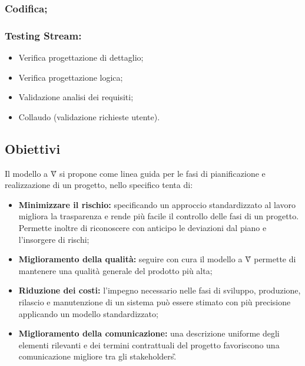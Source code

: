 \subsubsection*{Codifica;}

\subsubsection*{Testing Stream:}
\begin{itemize}
    \item Verifica progettazione di dettaglio;
    \item Verifica progettazione logica;
    \item Validazione analisi dei requisiti;
    \item Collaudo (validazione richieste utente).
\end{itemize}

\subsection{Obiettivi}
Il modello a V\G{} si propone come linea guida per le fasi di pianificazione e realizzazione di un progetto,
nello specifico tenta di:
\begin{itemize}
    \item \textbf{Minimizzare il rischio:} specificando un approccio standardizzato al lavoro migliora 
    la trasparenza e rende più facile il controllo delle fasi di un progetto. Permette inoltre di 
    riconoscere con anticipo le deviazioni dal piano e l'insorgere di rischi;
    \item \textbf{Miglioramento della qualità:} seguire con cura il modello a V\G{} permette di mantenere una
    qualità generale del prodotto più alta;
    \item \textbf{Riduzione dei costi:} l'impegno necessario nelle fasi di sviluppo, produzione, rilascio
    e manutenzione di un sistema può essere stimato con più precisione applicando un modello standardizzato;
    \item \textbf{Miglioramento della comunicazione:} una descrizione uniforme degli elementi rilevanti 
    e dei termini contrattuali del progetto favoriscono una comunicazione migliore tra gli stakeholders\G.
\end{itemize}